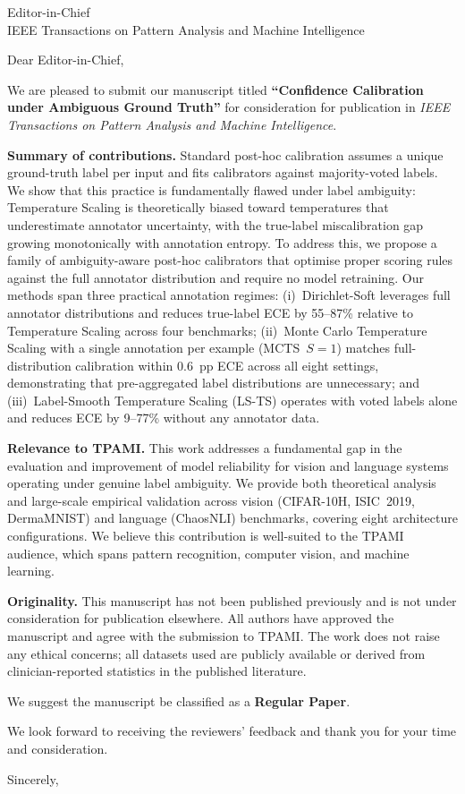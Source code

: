 \documentclass[11pt,a4paper]{letter}
\date{\today}
\begin{document}
\begin{letter}{
  Editor-in-Chief \\
  IEEE Transactions on Pattern Analysis and Machine Intelligence
}

\opening{Dear Editor-in-Chief,}

We are pleased to submit our manuscript titled
\textbf{``Confidence Calibration under Ambiguous Ground Truth''}
for consideration for publication in
\textit{IEEE Transactions on Pattern Analysis and Machine Intelligence}.

\textbf{Summary of contributions.}
Standard post-hoc calibration assumes a unique ground-truth label per input and fits
calibrators against majority-voted labels.
We show that this practice is fundamentally flawed under label ambiguity:
Temperature Scaling is theoretically biased toward temperatures that underestimate
annotator uncertainty, with the true-label miscalibration gap growing monotonically
with annotation entropy.
To address this, we propose a family of ambiguity-aware post-hoc calibrators that
optimise proper scoring rules against the full annotator distribution and require no
model retraining.
Our methods span three practical annotation regimes:
(i)~Dirichlet-Soft leverages full annotator distributions and reduces true-label ECE
by 55--87\% relative to Temperature Scaling across four benchmarks;
(ii)~Monte Carlo Temperature Scaling with a single annotation per example (MCTS~$S{=}1$)
matches full-distribution calibration within 0.6~pp ECE across all eight settings,
demonstrating that pre-aggregated label distributions are unnecessary;
and (iii)~Label-Smooth Temperature Scaling (LS-TS) operates with voted labels alone
and reduces ECE by 9--77\% without any annotator data.

\textbf{Relevance to TPAMI.}
This work addresses a fundamental gap in the evaluation and improvement of model
reliability for vision and language systems operating under genuine label ambiguity.
We provide both theoretical analysis and large-scale empirical validation across
vision (CIFAR-10H, ISIC~2019, DermaMNIST) and language (ChaosNLI) benchmarks,
covering eight architecture configurations.
We believe this contribution is well-suited to the TPAMI audience, which spans
pattern recognition, computer vision, and machine learning.

\textbf{Originality.}
This manuscript has not been published previously and is not under consideration
for publication elsewhere.
All authors have approved the manuscript and agree with the submission to TPAMI.
The work does not raise any ethical concerns; all datasets used are publicly available
or derived from clinician-reported statistics in the published literature.

We suggest the manuscript be classified as a \textbf{Regular Paper}.

We look forward to receiving the reviewers' feedback and thank you for your time
and consideration.

\closing{Sincerely,}

\end{letter}
\end{document}
